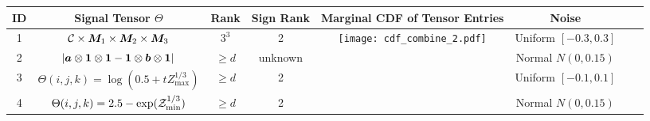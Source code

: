 \documentclass[10pt]{article}
\begin{document}
\renewcommand{\arraystretch}{1}

\begin{table}
\begin{tabular}{c|ccccccc}
ID &Signal Tensor $\Theta$ & Rank&  Sign Rank  & Marginal CDF of Tensor Entries & Noise  \\
\hline
1&$\mathcal{C}\times\bm M_1\times\bm M_2\times\bm M_3$ &$3^3$&2 & \multirow{4}{*}{
 \begin{minipage}{.2\textwidth}
 \centering
\texttt{[image: cdf\_combine\_2.pdf]}
  \end{minipage}
  }
 &
Uniform $[-0.3,0.3]$\\
  \rowcolor{lightgray}
2& $|\bm{a}\otimes \mathbf{1}\otimes\mathbf{1}-\mathbf{1}\otimes\bm{b}\otimes \mathbf{1}|$& $\geq d$&unknown&&
Normal $N(0,0.15)$\\
3& $\Theta(i,j,k)=\log(0.5+tZ^{1/3}_{\max})$&$\geq d$& 2&&
Uniform $[-0.1,0.1]$\\
 \rowcolor{lightgray}
4& $\Theta(i,j,k)=2.5-\exp(\mathcal{Z}^{1/3}_{\min})$& $\geq d$ & 2 & &
Normal $N(0,0.15)$
\end{tabular}
\end{table}
\end{document}
